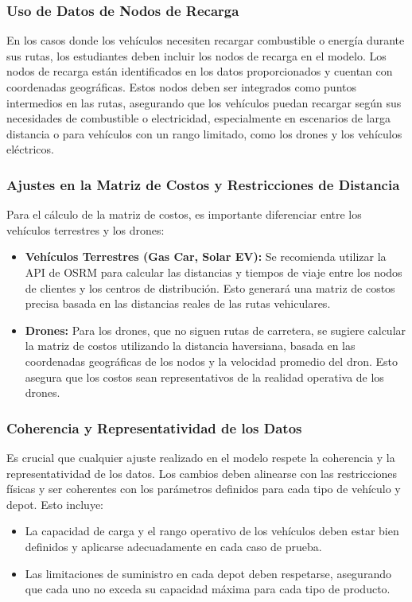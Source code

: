 \documentclass[12pt]{article}
\begin{document}
\subsubsection{Uso de Datos de Nodos de Recarga}

En los casos donde los vehículos necesiten recargar combustible o energía durante sus rutas, los estudiantes deben incluir los nodos de recarga en el modelo. Los nodos de recarga están identificados en los datos proporcionados y cuentan con coordenadas geográficas. Estos nodos deben ser integrados como puntos intermedios en las rutas, asegurando que los vehículos puedan recargar según sus necesidades de combustible o electricidad, especialmente en escenarios de larga distancia o para vehículos con un rango limitado, como los drones y los vehículos eléctricos.

\subsubsection{Ajustes en la Matriz de Costos y Restricciones de Distancia}

Para el cálculo de la matriz de costos, es importante diferenciar entre los vehículos terrestres y los drones:
\begin{itemize}
    \item \textbf{Vehículos Terrestres (Gas Car, Solar EV):} Se recomienda utilizar la API de OSRM para calcular las distancias y tiempos de viaje entre los nodos de clientes y los centros de distribución. Esto generará una matriz de costos precisa basada en las distancias reales de las rutas vehiculares.
    \item \textbf{Drones:} Para los drones, que no siguen rutas de carretera, se sugiere calcular la matriz de costos utilizando la distancia haversiana, basada en las coordenadas geográficas de los nodos y la velocidad promedio del dron. Esto asegura que los costos sean representativos de la realidad operativa de los drones.
\end{itemize}

\subsubsection{Coherencia y Representatividad de los Datos}

Es crucial que cualquier ajuste realizado en el modelo respete la coherencia y la representatividad de los datos. Los cambios deben alinearse con las restricciones físicas y ser coherentes con los parámetros definidos para cada tipo de vehículo y depot. Esto incluye:
\begin{itemize}
    \item La capacidad de carga y el rango operativo de los vehículos deben estar bien definidos y aplicarse adecuadamente en cada caso de prueba.
    \item Las limitaciones de suministro en cada depot deben respetarse, asegurando que cada uno no exceda su capacidad máxima para cada tipo de producto.
\end{itemize}
\end{document}
